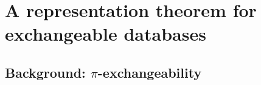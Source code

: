




\section{A representation theorem for exchangeable databases}
\label{sec:proof_database}

\subsection{Background: $\pi$-exchangeability}

